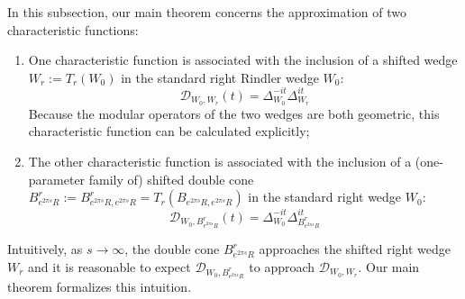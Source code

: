\documentclass[a4paper,11pt]{article}
\theoremstyle{definition}
\theoremstyle{remark}
\begin{document}
In this subsection, our main theorem concerns the approximation of two characteristic functions:
\begin{enumerate}
    \item One characteristic function is associated with the inclusion of a shifted wedge $W_r := T_r(W_0)$ in the standard right Rindler wedge $W_0$:
    \begin{equation}
        \mathcal{D}_{W_0, W_r}(t) = \Delta_{W_0}^{-it}\Delta_{W_r}^{it}
    \end{equation}
    Because the modular operators of the two wedges are both geometric, this characteristic function can be calculated explicitly;
    \item The other characteristic function is associated with the inclusion of a (one-parameter family of) shifted double cone $B^r_{e^{2\pi s }R}:=B^r_{e^{2\pi s}R, e^{2\pi s}R} = T_r(B_{e^{2\pi s}R, e^{2\pi s}R})$ in the standard right wedge $W_0$:
    \begin{equation}
        \mathcal{D}_{W_0, B^r_{e^{2\pi s}R}}(t) = \Delta_{W_0}^{-it}\Delta_{B^r_{e^{2\pi s}R}}^{it}
    \end{equation}
\end{enumerate}
Intuitively, as $s\rightarrow\infty$, the double cone $B^r_{e^{2\pi s}R}$ approaches the shifted right wedge $W_r$ and it is reasonable to expect $\mathcal{D}_{W_0,B^r_{e^{2\pi s}R}}$ to approach $\mathcal{D}_{W_0, W_r}$. Our main theorem formalizes this intuition.
\end{document}
